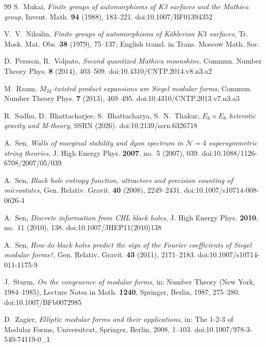 \documentclass[11pt]{amsart}
\theoremstyle{definition}
\begin{document}
\begin{thebibliography}{99}
 S.~Mukai, \emph{Finite groups of automorphisms of K3 surfaces and the Mathieu group}, Invent. Math. \textbf{94} (1988), 183--221. doi:10.1007/BF01394352

 V.~V.~Nikulin, \emph{Finite groups of automorphisms of K\"ahlerian $K3$ surfaces}, Tr. Mosk. Mat. Obs. \textbf{38} (1979), 75--137; English transl. in Trans. Moscow Math. Soc.

 D.~Persson, R.~Volpato, \emph{Second quantized Mathieu moonshine}, Commun. Number Theory Phys. \textbf{8} (2014), 403--509. doi:10.4310/CNTP.2014.v8.n3.a2

 M.~Raum, \emph{$M_{24}$-twisted product expansions are Siegel modular forms}, Commun. Number Theory Phys. \textbf{7} (2013), 469--495. doi:10.4310/CNTP.2013.v7.n3.a3

 R.~Sadhu, D.~Bhattacharjee, S.~Bhattacharya, S.~N.~Thakur, \emph{$E_8\times E_8$ heterotic gravity and M-theory}, SSRN (2026). doi:10.2139/ssrn.6326718

 A.~Sen, \emph{Walls of marginal stability and dyon spectrum in $\mathcal N=4$ supersymmetric string theories}, J. High Energy Phys. \textbf{2007}, no.~5 (2007), 039. doi:10.1088/1126-6708/2007/05/039

 A.~Sen, \emph{Black hole entropy function, attractors and precision counting of microstates}, Gen. Relativ. Gravit. \textbf{40} (2008), 2249--2431. doi:10.1007/s10714-008-0626-4

 A.~Sen, \emph{Discrete information from CHL black holes}, J. High Energy Phys. \textbf{2010}, no.~11 (2010), 138. doi:10.1007/JHEP11(2010)138

 A.~Sen, \emph{How do black holes predict the sign of the Fourier coefficients of Siegel modular forms?}, Gen. Relativ. Gravit. \textbf{43} (2011), 2171--2183. doi:10.1007/s10714-011-1175-9

 J.~Sturm, \emph{On the congruence of modular forms}, in: Number Theory (New York, 1984--1985), Lecture Notes in Math. \textbf{1240}, Springer, Berlin, 1987, 275--280. doi:10.1007/BFb0072985

 D.~Zagier, \emph{Elliptic modular forms and their applications}, in: The 1-2-3 of Modular Forms, Universitext, Springer, Berlin, 2008, 1--103. doi:10.1007/978-3-540-74119-0\_1
\end{thebibliography}
\endgroup
\end{document}
